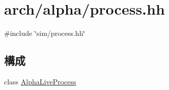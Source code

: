 \hypertarget{arch_2alpha_2process_8hh}{
\section{arch/alpha/process.hh}
\label{arch_2alpha_2process_8hh}
}
{\ttfamily \#include \char`\"{}sim/process.hh\char`\"{}}\par
\subsection*{構成}
\begin{DoxyCompactItemize}
\item 
class \hyperlink{classAlphaLiveProcess}{AlphaLiveProcess}
\end{DoxyCompactItemize}
